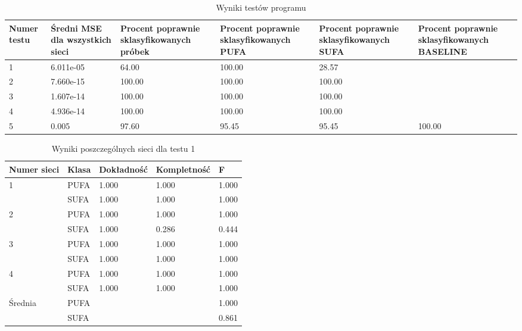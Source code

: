\documentclass{classrep}
\begin{document}
\begin{table}
\caption{Wyniki testów programu}
\label{testTab1}
\begin{tabular}{|p{1.5cm}|p{2cm}|p{2cm}|p{2cm}|p{2cm}|p{2cm}|}
 \textbf{Numer testu} & \textbf{Średni MSE dla wszystkich sieci} & \textbf{Procent poprawnie sklasyfikowanych próbek} & \textbf{Procent poprawnie sklasyfikowanych PUFA} & \textbf{Procent poprawnie sklasyfikowanych SUFA} & \textbf{Procent poprawnie sklasyfikowanych BASELINE} \\ \hline
 1 & 6.011e-05 & 64.00  & 100.00 & 28.57 & 	\\ \hline
 2 & 7.660e-15 & 100.00 & 100.00 & 100.00 &	\\ \hline
 3 & 1.607e-14 & 100.00 & 100.00 & 100.00 &	\\ \hline
 4 & 4.936e-14 & 100.00 & 100.00 & 100.00 &	\\ \hline
 5 & 0.005     & 97.60  & 95.45  & 95.45 & 100.00	\\ \hline
\end{tabular}
\end{table}

\begin{table}
\caption{Wyniki poszczególnych sieci dla testu 1}
\label{testTab2}
\begin{tabular}{|p{1.5cm}|p{2.5cm}|p{2.5cm}|p{2.5cm}|p{2.5cm}|}
 \textbf{Numer sieci} & \textbf{Klasa} & \textbf{Dokładność} & \textbf{Kompletność} & \textbf{F} \\ \hline
\multirow{2}{*}{1} 
& PUFA & 1.000 & 1.000 & 1.000 \\
& SUFA & 1.000 & 1.000 & 1.000 \\ \hline
\multirow{2}{*}{2} 
& PUFA & 1.000 & 1.000 & 1.000 \\
& SUFA & 1.000 & 0.286 & 0.444 \\ \hline
\multirow{2}{*}{3} 
& PUFA & 1.000 & 1.000 & 1.000 \\
& SUFA & 1.000 & 1.000 & 1.000\\ \hline
\multirow{2}{*}{4} 
& PUFA & 1.000 & 1.000 & 1.000 \\
& SUFA & 1.000 & 1.000 & 1.000 \\ \hline
\multirow{2}{*}{Średnia}
& PUFA &       &       & 1.000 \\
& SUFA &       &       & 0.861 \\\hline
\end{tabular}
\end{table}
\end{document}
